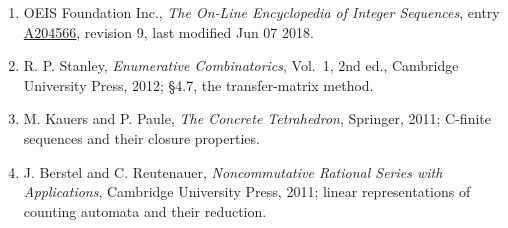 \documentclass[11pt]{article}
\theoremstyle{definition}
\begin{document}
\begin{enumerate}

\item OEIS Foundation Inc., \emph{The On-Line Encyclopedia of Integer Sequences}, entry \href{https://oeis.org/A204566}{A204566}, revision 9, last modified Jun 07 2018.

\item R. P. Stanley, \emph{Enumerative Combinatorics}, Vol.~1, 2nd ed., Cambridge University Press, 2012; \S4.7, the transfer-matrix method.

\item M. Kauers and P. Paule, \emph{The Concrete Tetrahedron}, Springer, 2011; C-finite sequences and their closure properties.

\item J. Berstel and C. Reutenauer, \emph{Noncommutative Rational Series with Applications}, Cambridge University Press, 2011; linear representations of counting automata and their reduction.

\end{enumerate}
\end{document}
